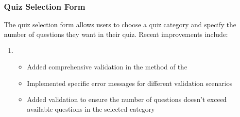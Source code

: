 \documentclass[letterpaper,10pt,english]{sphinxmanual}
\begin{document}
\subsubsection{Quiz Selection Form}
\label{\detokenize{improvements:quiz-selection-form}}
\sphinxAtStartPar
The quiz selection form allows users to choose a quiz category and specify the number of questions
they want in their quiz. Recent improvements include:
\begin{enumerate}
%
\item {} 
\sphinxAtStartPar
{}
\begin{itemize}
\item {} 
\sphinxAtStartPar
Added comprehensive validation in the  method of the 

\item {} 
\sphinxAtStartPar
Implemented specific error messages for different validation scenarios

\item {} 
\sphinxAtStartPar
Added validation to ensure the number of questions doesn’t exceed available questions in the selected category

\end{itemize}

\begin{sphinxVerbatim}[commandchars=\\\{\}]
      
      
      

      
         


\end{sphinxVerbatim}
\end{enumerate}
\end{document}

